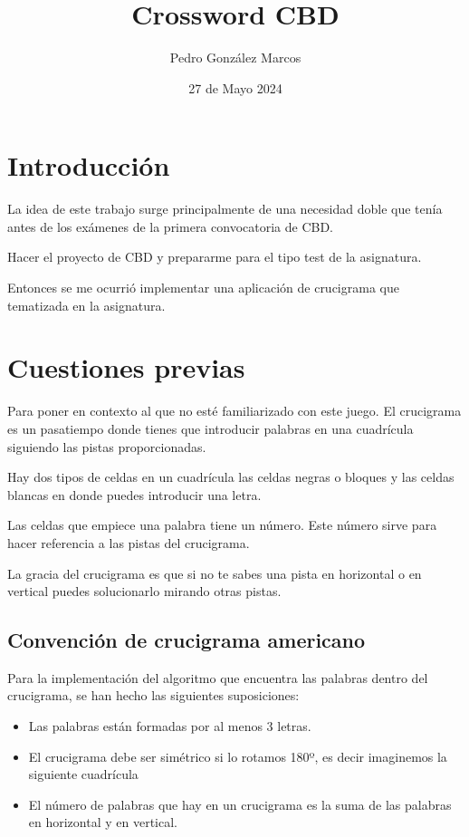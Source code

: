 \documentclass[12pt, a4paper]{article}
\title{Crossword CBD}
\author{Pedro González Marcos}
\date{27 de Mayo 2024}
\begin{document}
\maketitle

\tableofcontents

\section{Introducción}

La idea de este trabajo surge principalmente de una necesidad doble
que tenía antes de los exámenes de la primera convocatoria de CBD.

Hacer el proyecto de CBD y prepararme para el tipo test de la asignatura.

Entonces se me ocurrió implementar una aplicación de crucigrama que
tematizada en la asignatura. 




\section{Cuestiones previas}

Para poner en contexto al que no esté familiarizado con este juego.
El crucigrama es un pasatiempo donde tienes que introducir palabras
en una cuadrícula siguiendo las pistas proporcionadas.

Hay dos tipos de celdas en un cuadrícula las celdas negras o bloques y las
celdas blancas en donde puedes introducir una letra.

Las celdas que empiece una palabra tiene un número. Este número sirve
para hacer referencia a las pistas del crucigrama. 

La gracia del crucigrama es que si no te sabes una pista en horizontal o en 
vertical puedes solucionarlo mirando otras pistas.

\subsection{Convención de crucigrama americano}

Para la implementación del algoritmo que encuentra las palabras dentro del
crucigrama, se han hecho las siguientes suposiciones:

\begin{itemize}
	\item Las palabras están formadas por al menos 3 letras.
	\item El crucigrama debe ser simétrico si lo rotamos 180º, es decir
	imaginemos la siguiente cuadrícula
	\item El número de palabras que hay en un crucigrama es la suma de
	las palabras en horizontal y en vertical.
\end{itemize}
\end{document}
